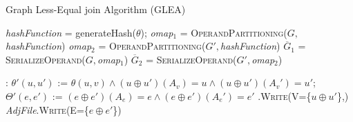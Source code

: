 \begin{algorithm}[!b]
	\caption{Graph Less-Equal join Algorithm (GLEA)}\label{alg:leqjoinalg}
	{
		\begin{minipage}{\linewidth}
			\begin{algorithmic}[1]
				\State \textit{hashFunction} = generateHash($\theta$);
				\State \textit{omap}$_1$ = \textsc{OperandPartitioning}($G,$\textit{hashFunction})
				\State \textit{omap}$_2$ = \textsc{OperandPartitioning}($G',$\textit{hashFunction})
				\State $\overline{G}_1$ = \textsc{SerializeOperand}($G,$\textit{omap}$_1$)
				\State  $\overline{G}_2$ = \textsc{SerializeOperand}($G',$\textit{omap}$_2$)

				\EndProcedure

				\State





				:
				\State $\theta'(u,u')$ := $\theta(u,v)\wedge (u\oplus u')(A_v)=u\wedge (u\oplus u')(A_v')=u'$;
				\State $\Theta'(e,e')$ := $(e\oplus e')(A_e)=e \wedge (e\oplus e')(A_e')=e'$
				.\textsc{Write}(V=\{$u\oplus u'$\},)
				\State \textit{AdjFile}.\textsc{Write}(E=\{$e\oplus e'$\})
				\EndIf
				\EndFor
				\EndFor
				\EndFor
				\EndIf
				\EndFor
				\EndFor
				\EndFor

				\EndProcedure
			\end{algorithmic}
	\end{minipage}}
\end{algorithm}



